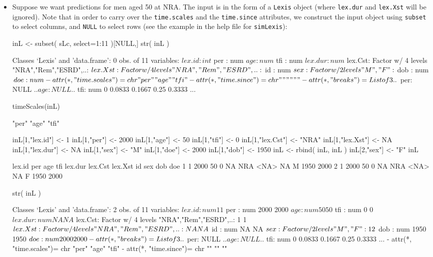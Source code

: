 \begin{enumerate}[resume]
\begin{itemize}
\item Suppose we want predictions for men aged 50 at
  NRA. The input is in the form of a \texttt{Lexis} object (where
  \texttt{lex.dur} and \texttt{lex.Xst} will be ignored). Note that in
  order to carry over the \texttt{time.scales} and the
  \texttt{time.since} attributes, we construct the input object using
  \texttt{subset} to select columns, and \texttt{NULL} to select rows
  (see the example in the help file for \texttt{simLexis}):
\begin{Schunk}
\begin{Sinput}
 inL <- subset( sLc, select=1:11 )[NULL,]
 str( inL )
\end{Sinput}
\begin{Soutput}
Classes ‘Lexis’ and 'data.frame':	0 obs. of  11 variables:
 $ lex.id : int 
 $ per    : num 
 $ age    : num 
 $ tfi    : num 
 $ lex.dur: num 
 $ lex.Cst: Factor w/ 4 levels "NRA","Rem","ESRD",..: 
 $ lex.Xst: Factor w/ 4 levels "NRA","Rem","ESRD",..: 
 $ id     : num 
 $ sex    : Factor w/ 2 levels "M","F": 
 $ dob    : num 
 $ doe    : num 
 - attr(*, "time.scales")= chr  "per" "age" "tfi"
 - attr(*, "time.since")= chr  "" "" ""
 - attr(*, "breaks")=List of 3
  ..$ per: NULL
  ..$ age: NULL
  ..$ tfi: num  0 0.0833 0.1667 0.25 0.3333 ...
\end{Soutput}
\begin{Sinput}
 timeScales(inL)
\end{Sinput}
\begin{Soutput}
[1] "per" "age" "tfi"
\end{Soutput}
\begin{Sinput}
 inL[1,"lex.id"] <- 1
 inL[1,"per"] <- 2000
 inL[1,"age"] <- 50
 inL[1,"tfi"] <- 0
 inL[1,"lex.Cst"] <- "NRA"
 inL[1,"lex.Xst"] <- NA
 inL[1,"lex.dur"] <- NA
 inL[1,"sex"] <- "M"
 inL[1,"doe"] <- 2000
 inL[1,"dob"] <- 1950
 inL <- rbind( inL, inL )
 inL[2,"sex"] <- "F"
 inL
\end{Sinput}
\begin{Soutput}
  lex.id  per age tfi lex.dur lex.Cst lex.Xst id sex  dob  doe
1      1 2000  50   0      NA     NRA    <NA> NA   M 1950 2000
2      1 2000  50   0      NA     NRA    <NA> NA   F 1950 2000
\end{Soutput}
\begin{Sinput}
 str( inL )
\end{Sinput}
\begin{Soutput}
Classes ‘Lexis’ and 'data.frame':	2 obs. of  11 variables:
 $ lex.id : num  1 1
 $ per    : num  2000 2000
 $ age    : num  50 50
 $ tfi    : num  0 0
 $ lex.dur: num  NA NA
 $ lex.Cst: Factor w/ 4 levels "NRA","Rem","ESRD",..: 1 1
 $ lex.Xst: Factor w/ 4 levels "NRA","Rem","ESRD",..: NA NA
 $ id     : num  NA NA
 $ sex    : Factor w/ 2 levels "M","F": 1 2
 $ dob    : num  1950 1950
 $ doe    : num  2000 2000
 - attr(*, "breaks")=List of 3
  ..$ per: NULL
  ..$ age: NULL
  ..$ tfi: num  0 0.0833 0.1667 0.25 0.3333 ...
 - attr(*, "time.scales")= chr  "per" "age" "tfi"
 - attr(*, "time.since")= chr  "" "" ""
\end{Soutput}
\end{Schunk}


\end{itemize}
\end{enumerate}
